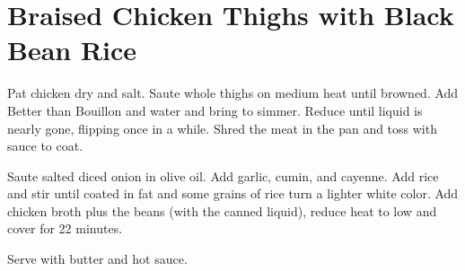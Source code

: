 \section{Braised Chicken Thighs with Black Bean Rice}
\begin{recipe}



Pat chicken dry and salt.
Saute whole thighs on medium heat until browned. 
Add Better than Bouillon and water and bring to simmer. 
Reduce until liquid is nearly gone, flipping once in a while.
Shred the meat in the pan and toss with sauce to coat. 


Saute salted diced onion in olive oil. 
Add garlic, cumin, and cayenne. 
Add rice and stir until coated in fat and some grains of rice turn a lighter white color. 
Add chicken broth plus the beans (with the canned liquid), reduce heat to low and cover for 22 minutes. 

Serve with butter and hot sauce.

\end{recipe}
